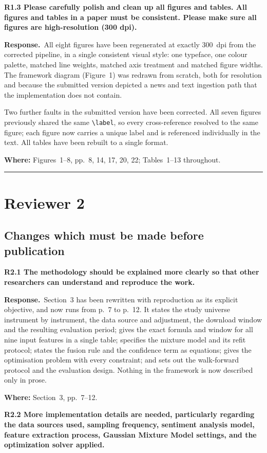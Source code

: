\documentclass[11pt,a4paper]{article}
\newcommand{\rc}[1]{\par\medskip\noindent\textbf{#1}\par\nopagebreak}
\newcommand{\resp}{\par\noindent\textbf{Response.}\ }
\newcommand{\where}[1]{\par\smallskip\noindent\textcolor{blue!55!black}{\textbf{Where:} #1}\par}
\begin{document}
\rc{R1.3 Please carefully polish and clean up all figures and tables. All figures and
tables in a paper must be consistent. Please make sure all figures are high-resolution
(300 dpi).}

\resp All eight figures have been regenerated at exactly 300~dpi from the corrected
pipeline, in a single consistent visual style: one typeface, one colour palette, matched
line weights, matched axis treatment and matched figure widths. The framework diagram
(Figure~1) was redrawn from scratch, both for resolution and because the submitted
version depicted a news and text ingestion path that the implementation does not
contain.

Two further faults in the submitted version have been corrected. All seven figures
previously shared the same \verb|\label|, so every cross-reference resolved to the same
figure; each figure now carries a unique label and is referenced individually in the
text. All tables have been rebuilt to a single format.
\where{Figures~1--8, pp.~8, 14, 17, 20, 22; Tables~1--13 throughout.}

\bigskip
\hrule
\section*{Reviewer 2}

\subsection*{Changes which must be made before publication}

\rc{R2.1 The methodology should be explained more clearly so that other researchers can
understand and reproduce the work.}

\resp Section~3 has been rewritten with reproduction as its explicit objective, and now
runs from p.~7 to p.~12. It states the study universe instrument by instrument, the data
source and adjustment, the download window and the resulting evaluation period; gives
the exact formula and window for all nine input features in a single table; specifies
the mixture model and its refit protocol; states the fusion rule and the confidence term
as equations; gives the optimisation problem with every constraint; and sets out the
walk-forward protocol and the evaluation design. Nothing in the framework is now
described only in prose.
\where{Section~3, pp.~7--12.}

\rc{R2.2 More implementation details are needed, particularly regarding the data sources
used, sampling frequency, sentiment analysis model, feature extraction process, Gaussian
Mixture Model settings, and the optimization solver applied.}
\end{document}
